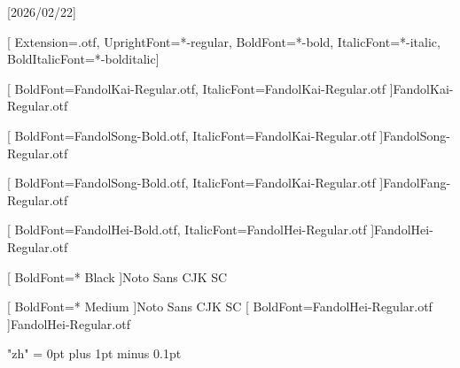 [2026/02/22]

\setsansfont{texgyreheros}[     %
Extension=.otf,
UprightFont=*-regular,
BoldFont=*-bold,
ItalicFont=*-italic,
BoldItalicFont=*-bolditalic]





[
	BoldFont=FandolKai-Regular.otf, ItalicFont=FandolKai-Regular.otf
]{FandolKai-Regular.otf}

[
	BoldFont=FandolSong-Bold.otf,
	ItalicFont=FandolKai-Regular.otf
]{FandolSong-Regular.otf}

[
	BoldFont=FandolSong-Bold.otf,
	ItalicFont=FandolKai-Regular.otf
]{FandolFang-Regular.otf}

[
	BoldFont=FandolHei-Bold.otf,
	ItalicFont=FandolHei-Regular.otf
]{FandolHei-Regular.otf}


[
	BoldFont=* Black
]{Noto Sans CJK SC}

[
	BoldFont=* Medium
]{Noto Sans CJK SC}	%
[
	BoldFont=FandolHei-Regular.otf
]{FandolHei-Regular.otf}	%

\XeTeXlinebreaklocale "zh"
\XeTeXlinebreakskip = 0pt plus 1pt minus 0.1pt

\newcommand\kaishu{\CJKfamily{kai}} %
\newcommand\songti{\CJKfamily{song}} %
\newcommand\heiti{\CJKfamily{hei}}	%
\newcommand\thmheiti{\CJKfamily{hei2}}	%
\newcommand\fangsong{\CJKfamily{fangsong}} %
\renewcommand{\em}{\bfseries\CJKfamily{emfont}} %